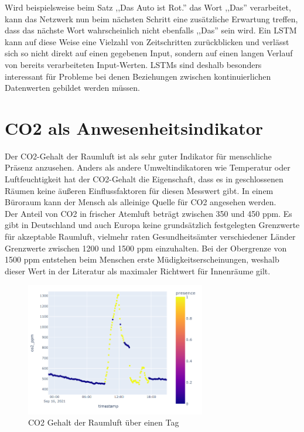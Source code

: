 Wird beispielsweise beim Satz ,,Das Auto ist Rot.'' das Wort ,,Das'' verarbeitet, kann das Netzwerk nun beim nächsten
Schritt eine zusätzliche Erwartung treffen, dass das nächste Wort wahrscheinlich nicht ebenfalls ,,Das'' sein wird.
Ein LSTM kann auf diese Weise eine Vielzahl von Zeitschritten zurückblicken und verlässt sich so nicht direkt auf 
einen gegebenen Input, sondern auf einen langen Verlauf von bereits verarbeiteten Input-Werten. 
LSTMs sind deshalb besonders interessant für Probleme bei denen Beziehungen zwischen kontinuierlichen 
Datenwerten gebildet werden müssen.\newpage

\section{CO2 als Anwesenheitsindikator}\label{CO2}

Der CO2-Gehalt der Raumluft ist als sehr guter Indikator für menschliche Präsenz anzusehen. Anders als andere 
Umweltindikatoren wie Temperatur oder Luftfeuchtigkeit hat der CO2-Gehalt die Eigenschaft, dass es in 
geschlossenen Räumen keine äußeren Einflussfaktoren für diesen Messwert gibt. In einem Büroraum kann der 
Mensch als alleinige Quelle für CO2 angesehen werden.\\
Der Anteil von CO2 in frischer Atemluft beträgt zwischen 350 und 450 ppm. Es gibt in Deutschland und auch Europa 
keine grundsätzlich festgelegten Grenzwerte für akzeptable Raumluft, vielmehr raten Gesundheitsämter 
verschiedener Länder Grenzwerte zwischen 1200 und 1500 ppm einzuhalten. Bei der Obergrenze von 1500 ppm 
entstehen beim Menschen erste Müdigkeitserscheinungen, weshalb dieser Wert in der Literatur als maximaler 
Richtwert für Innenräume gilt.

\begin{figure}[h]
    \centering
    \includegraphics[width=0.7\textwidth]{pic/co2_singleDay.png}
    \caption{CO2 Gehalt der Raumluft über einen Tag}
    \label{fig:CO2_oneDay}
\end{figure}

